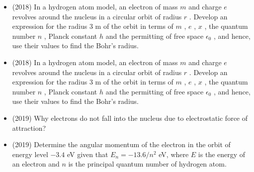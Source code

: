 \documentclass{article}
\begin{document}
\begin{itemize}
\item (2018)  In a hydrogen atom model, an electron of mass $ m$ and charge $ e$ revolves around the nucleus in a circular orbit of radius $ r$ . Develop an expression for the radius $ 3$ m of the orbit in terms of $ m$ , $ e$ , $ x$ , the quantum number $ n$ , Planck constant $ h$ and the permitting of free space $ \epsilon _{0}$ , and hence, use their values to find the Bohr’s radius. 
\item (2018)  In a hydrogen atom model, an electron of mass $ m$ and charge $ e$ revolves around the nucleus in a circular orbit of radius $ r$ . Develop an expression for the radius $ 3$ m of the orbit in terms of $ m$ , $ e$ , $ x$ , the quantum number $ n$ , Planck constant $ h$ and the permitting of free space $ \epsilon _{0}$ , and hence, use their values to find the Bohr’s radius. 
\item (2019)  Why electrons do not fall into the nucleus due to electrostatic force of attraction?
\item (2019)  Determine the angular momentum of the electron in the orbit of energy level $ -3.4$ eV given that $ E_{n}=-13.6/n^{2}$ eV, where $ E$ is the energy of an electron and $ n$ is the principal quantum number of hydrogen atom. 
\end{itemize}
\end{document}
